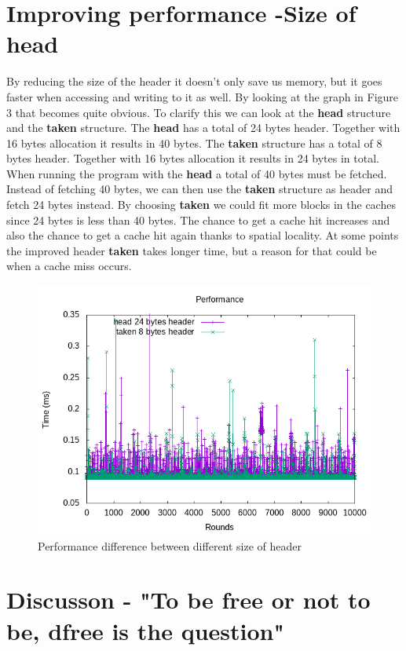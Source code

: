\documentclass[12pt, letterpaper]{article}
\begin{document}
\section{Improving performance -Size of head}

By reducing the size of the header it doesn't only save us memory, but it goes faster when accessing and writing to it as well.
By looking at the graph in Figure 3 that becomes quite obvious. To clarify this we can look at the \textbf{head} structure and the \textbf{taken} structure.
The \textbf{head} has a total of 24 bytes header. Together with 16 bytes allocation it results in 40 bytes. The \textbf{taken} structure has a total of 8 bytes header.
Together with 16 bytes allocation it results in 24 bytes in total. When running the program with the \textbf{head} a total of 40 bytes must be fetched.
Instead of fetching 40 bytes, we can then use the \textbf{taken} structure as header and fetch 24 bytes instead. By choosing \textbf{taken} we could fit more
blocks in the caches since 24 bytes is less than 40 bytes. The chance to get a cache hit increases and also the chance to get a cache hit again thanks to spatial locality. 
At some points the improved header \textbf{taken} takes longer time, but a reason for that could be when a cache miss occurs.

\begin{figure}[h]
    \center
    \includegraphics[scale=0.65]{graph2.png}
    \caption{Performance difference between different size of header}
    \label{fig:graph2}
\end{figure}

\section{Discusson - "To be free or not to be, dfree is the question"}
\end{document}
